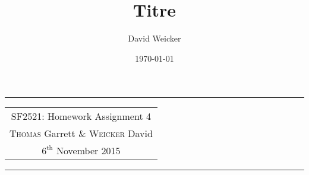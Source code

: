 \documentclass[11pt,a4paper]{article}
\title{Titre}
\author{David Weicker}
\date{\today}
\begin{document}
\tabulinesep=1.2mm
\begin{center}
\hrule
\begin{tabular}{c}
\\[0.005cm]
\Large{SF2521: Homework Assignment 4}\\[0.3cm] %
\textsc{Thomas} Garrett  \& \textsc{Weicker} David\\[0.2cm]
$\text{6}^{\text{th}}$ November 2015\\[0.2cm] %
\end{tabular}
\hrule
\end{center}

\end{document}
